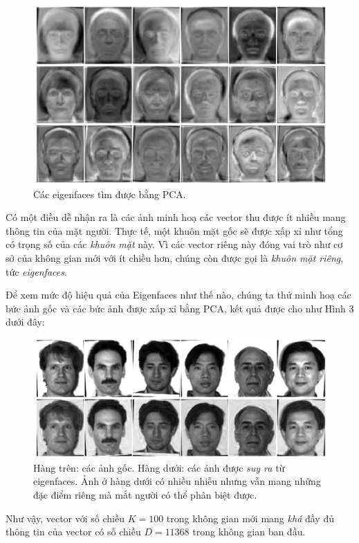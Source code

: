 \begin{figure}[t]
\centering
    \includegraphics[width = \textwidth]{Chapters/07_DimemsionalityReduction/28_pca2/latex/yaleb_eig.pdf}
    \caption[]{Các eigenfaces tìm được bằng PCA.}
    \label{fig:28_2}
\end{figure}
 
Có một điều dễ nhận ra là các ảnh minh hoạ các vector thu được ít nhiều mang thông tin của mặt người. Thực tế, một khuôn mặt gốc sẽ được xấp xỉ như tổng có trọng số của các \textit{khuôn mặt} này. Vì các vector riêng này đóng vai trò như cơ sở của không gian mới với ít chiều hơn, chúng còn được gọi là \textit{khuôn mặt riêng}, tức \textit{eigenfaces}. 
 
Để xem mức độ hiệu quả của Eigenfaces như thế nào, chúng ta thử minh hoạ các bức ảnh gốc và các bức ảnh được xấp xỉ bằng PCA, kết quả được cho như Hình 3 dưới đây: 
 

\begin{figure}[t]
\centering
    \includegraphics[width = \textwidth]{Chapters/07_DimemsionalityReduction/28_pca2/latex/yaleb_ori_res.pdf}
    \caption[]{Hàng trên: các ảnh gốc. Hàng dưới: các ảnh được \textit{suy ra} từ eigenfaces. Ảnh ở hàng dưới có nhiều nhiễu nhưng vẫn mang những đặc điểm riêng mà mắt người có thể phân biệt được.}
    \label{fig:28_3}
\end{figure}
Như vậy, vector với số chiều $K = 100$ trong không gian mới mang \textit{khá} đầy đủ thông tin của vector có số chiều $D = 11368$ trong không gian ban đầu. 
 
